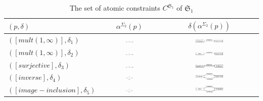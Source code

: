 \documentclass{eceasst}
\begin{document}
\begin{table}[h]\label{tbl:atomicconstraint}
 \caption{The set of atomic constraints $C^{\mathfrak{S}_1}$ of  $\mathfrak{S}_1$}
 \small
 \begin{center}
    \begin{tabular}{| l | c | c | }    
    \hline
    $(p,\delta)$ & $\alpha^{\Sigma_2}(p)$ & $\delta(\alpha^{\Sigma_2}(p))  $ \\ \hline
    $([mult(1,\infty)], \delta_1)$ & \includegraphics[width=0.13\textwidth]{mult.pdf} & \includegraphics[width=0.3\textwidth]{atomic_delta1.pdf}  \\ \hline    
    $([mult(1,\infty)], \delta_2)$ & \includegraphics[width=0.13\textwidth]{mult.pdf} & \includegraphics[width=0.3\textwidth]{atomic_delta2.pdf}  \\ \hline    
    $([surjective], \delta_3)$ & \includegraphics[width=0.13\textwidth]{mult.pdf} & \includegraphics[width=0.3\textwidth]{atomic_delta3.pdf}  \\ \hline    
    $([inverse], \delta_4)$ & \includegraphics[width=0.11\textwidth]{inv_1.pdf} & \includegraphics[width=0.3\textwidth]{atomic_delta4.pdf}  \\ \hline    
    $([image-inclusion], \delta_5)$ & \includegraphics[width=0.11\textwidth]{img_1.pdf} & \includegraphics[width=0.3\textwidth]{atomic_delta5.pdf}  \\   
    \hline    
    \end{tabular}
    \end{center}
\end{table}
\normalsize
\end{document}

